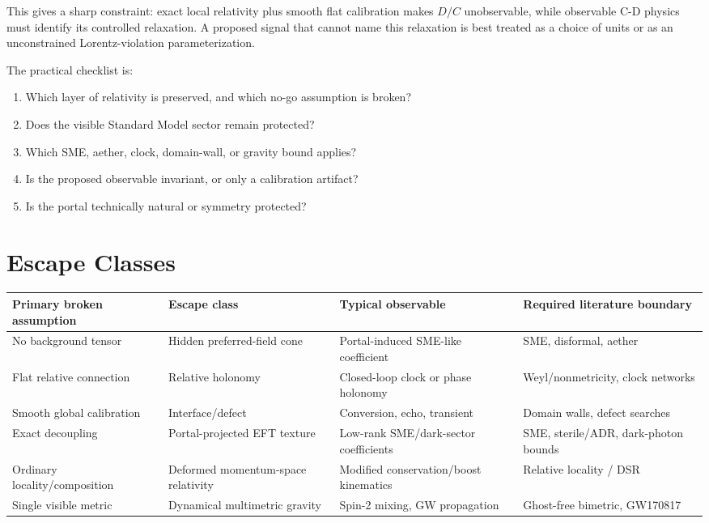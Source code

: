 \documentclass[11pt]{article}
\begin{document}
This gives a sharp constraint: exact local relativity plus smooth flat calibration makes \(D/C\) unobservable, while observable C-D physics must identify its controlled relaxation. A proposed signal that cannot name this relaxation is best treated as a choice of units or as an unconstrained Lorentz-violation parameterization.


The practical checklist is:


\begin{enumerate}
\item Which layer of relativity is preserved, and which no-go assumption is broken?
\item Does the visible Standard Model sector remain protected?
\item Which SME, aether, clock, domain-wall, or gravity bound applies?
\item Is the proposed observable invariant, or only a calibration artifact?
\item Is the portal technically natural or symmetry protected?
\end{enumerate}


\section{Escape Classes}


\begin{center}
\small
\begin{tabularx}{\textwidth}{@{}>{\raggedright\arraybackslash}p{} >{\raggedright\arraybackslash}p{} >{\raggedright\arraybackslash}p{} >{\raggedright\arraybackslash}p{}@{}}
\toprule
Primary broken assumption & Escape class & Typical observable & Required literature boundary \\
\midrule
No background tensor & Hidden preferred-field cone & Portal-induced SME-like coefficient & SME, disformal, aether \\
Flat relative connection & Relative holonomy & Closed-loop clock or phase holonomy & Weyl/nonmetricity, clock networks \\
Smooth global calibration & Interface/defect & Conversion, echo, transient & Domain walls, defect searches \\
Exact decoupling & Portal-projected EFT texture & Low-rank SME/dark-sector coefficients & SME, sterile/ADR, dark-photon bounds \\
Ordinary locality/composition & Deformed momentum-space relativity & Modified conservation/boost kinematics & Relative locality / DSR \citep{AmelinoCamelia2011RelativeLocality} \\
Single visible metric & Dynamical multimetric gravity & Spin-2 mixing, GW propagation & Ghost-free bimetric, GW170817 \citep{HassanRosen2011Bimetric,HassanRosen2011Secondary,LIGO2017GW170817GRB} \\
\bottomrule
\end{tabularx}
\end{center}
\end{document}
